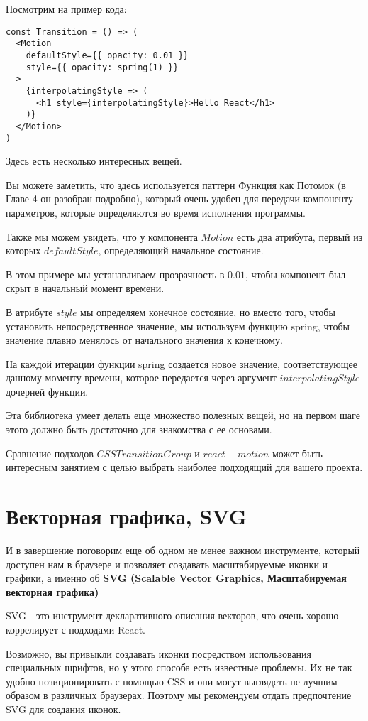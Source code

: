 Посмотрим на пример кода:

\begin{lstlisting}
const Transition = () => (
  <Motion
    defaultStyle={{ opacity: 0.01 }}
    style={{ opacity: spring(1) }}
  >
    {interpolatingStyle => (
      <h1 style={interpolatingStyle}>Hello React</h1>
    )} 
  </Motion>
)
\end{lstlisting}

Здесь есть несколько интересных вещей.

Вы можете заметить, что здесь используется паттерн Функция как Потомок (в Главе 4 он разобран подробно), который очень удобен для передачи компоненту параметров, которые определяются во время исполнения программы.

Также мы можем увидеть, что у компонента $Motion$ есть два атрибута, первый из которых $defaultStyle$, определяющий начальное состояние.

В этом примере мы устанавливаем прозрачность в $0.01$, чтобы компонент был скрыт в начальный момент времени.

В атрибуте $style$ мы определяем конечное состояние, но вместо того, чтобы установить непосредственное значение, мы используем функцию spring, чтобы значение плавно менялось от начального значения к конечному.

На каждой итерации функции spring создается новое значение, соответствующее данному моменту времени, которое передается через аргумент $interpolatingStyle$ дочерней функции.

Эта библиотека умеет делать еще множество полезных вещей, но на первом шаге этого должно быть достаточно для знакомства с ее основами.

Сравнение подходов $CSSTransitionGroup$ и $react-motion$ может быть интересным занятием с целью выбрать наиболее подходящий для вашего проекта.

\section{Векторная графика, SVG}

И в завершение поговорим еще об одном не менее важном инструменте, который доступен нам в браузере и позволяет создавать масштабируемые иконки и графики, а именно об \textbf{SVG (Scalable Vector Graphics, Масштабируемая векторная графика)}

SVG - это инструмент декларативного описания векторов, что очень хорошо коррелирует с подходами React.

Возможно, вы привыкли создавать иконки посредством использования специальных шрифтов, но у этого способа есть известные проблемы. Их не так удобно позиционировать с помощью CSS и они могут выглядеть не лучшим образом в различных браузерах. Поэтому мы рекомендуем отдать предпочтение SVG для создания иконок. 


